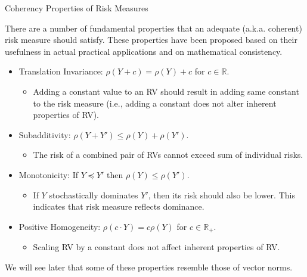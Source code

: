 \documentclass[9pt]{beamer}
\begin{document}
%
\begin{frame}{Coherency Properties of Risk Measures}

There are a number of fundamental properties that an adequate (a.k.a. coherent) risk measure should satisfy. These properties have been proposed based on their usefulness in actual practical applications and on mathematical consistency. 
\begin{block}{}
\begin{itemize}
\setlength{\itemsep}{10pt}
\item Translation Invariance: $\rho(Y+c)=\rho(Y)+c$ for $c\in \mathbb{R}$. 
\begin{itemize}
\item Adding a constant value to an RV should result in adding same constant to the risk measure (i.e., adding a constant does not alter inherent properties of RV).
\end{itemize}
\item Subadditivity: $\rho(Y+Y')\leq \rho(Y)+\rho(Y')$. 
\begin{itemize}
\item The risk of a combined pair of RVs cannot exceed sum of individual risks. 
\end{itemize}
\item Monotonicity:  If $Y\preceq Y'$ then $\rho(Y)\leq \rho(Y')$. 
\begin{itemize}
\item If $Y$ stochastically dominates $Y'$, then its risk should also be lower. This indicates that risk measure reflects dominance. 
\end{itemize}
\item Positive Homogeneity: $\rho(c\cdot Y)=c\rho(Y)$ for $c\in \mathbb{R}_+$. 
\begin{itemize}
\item Scaling RV by a constant does not affect inherent properties of RV.
\end{itemize}
\end{itemize}
\end{block}
We will see later that some of these properties resemble those of vector norms. 

\end{frame}
\end{document}
